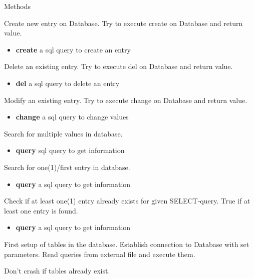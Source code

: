 \begin{methodenv}{Methods}
	
	 Create new entry on Database. Try to execute create on Database and return value.
	
	\begin{itemize}
		\item \textbf{create} 
		a sql query to create an entry
	\end{itemize}
	
	 Delete an existing entry. Try to execute del on Database and return value.
	
	\begin{itemize}
		\item \textbf{del} 
		a sql query to delete an entry
	\end{itemize}
	
	 Modify an existing entry. Try to execute change on Database and return value.
	
	\begin{itemize}
		\item \textbf{change} 
		a sql query to change values
	\end{itemize}

	Search for multiple values in database.

	\begin{itemize}
		\item \textbf{query} 
		sql query to get information
	\end{itemize}
Search for one(1)/first entry in database.

\begin{itemize}
	\item \textbf{query} 
	a sql query to get information
\end{itemize}
Check if at least one(1) entry already exists for given SELECT-query.
True if at least one entry is found.

\begin{itemize}
	\item \textbf{query} 
	a sql query to get information
\end{itemize}
First setup of tables in the database.
Establish connection to Database with set parameters.
Read queries from external file and execute them.

Don't crash if tables already exist.
\end{methodenv}

\newpage